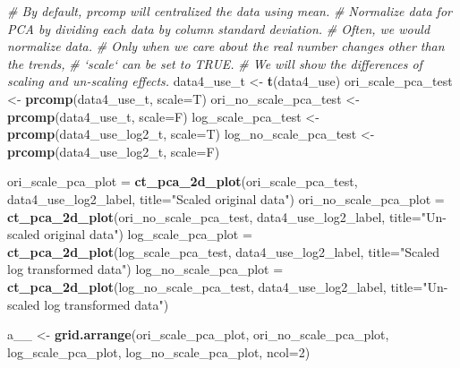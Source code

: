 \documentclass[]{article}
\newenvironment{Shaded}{\begin{snugshade}}{\end{snugshade}}
\newcommand{\KeywordTok}[1]{\textcolor[rgb]{0.13,0.29,0.53}{\textbf{{#1}}}}
\newcommand{\DataTypeTok}[1]{\textcolor[rgb]{0.13,0.29,0.53}{{#1}}}
\newcommand{\DecValTok}[1]{\textcolor[rgb]{0.00,0.00,0.81}{{#1}}}
\newcommand{\StringTok}[1]{\textcolor[rgb]{0.31,0.60,0.02}{{#1}}}
\newcommand{\CommentTok}[1]{\textcolor[rgb]{0.56,0.35,0.01}{\textit{{#1}}}}
\newcommand{\NormalTok}[1]{{#1}}
\numberwithin{figure}{section}
\numberwithin{table}{section}
\theoremstyle{definition}
\theoremstyle{definition}
\theoremstyle{definition}
\theoremstyle{remark}
\begin{document}
\begin{Shaded}
\begin{Highlighting}[]
\CommentTok{# By default, prcomp will centralized the data using mean.}
\CommentTok{# Normalize data for PCA by dividing each data by column standard deviation.}
\CommentTok{# Often, we would normalize data.}
\CommentTok{# Only when we care about the real number changes other than the trends,}
\CommentTok{# `scale` can be set to TRUE. }
\CommentTok{# We will show the differences of scaling and un-scaling effects.}
\NormalTok{data4_use_t <-}\StringTok{ }\KeywordTok{t}\NormalTok{(data4_use)}
\NormalTok{ori_scale_pca_test <-}\StringTok{ }\KeywordTok{prcomp}\NormalTok{(data4_use_t, }\DataTypeTok{scale=}\NormalTok{T)}
\NormalTok{ori_no_scale_pca_test <-}\StringTok{ }\KeywordTok{prcomp}\NormalTok{(data4_use_t, }\DataTypeTok{scale=}\NormalTok{F)}
\NormalTok{log_scale_pca_test <-}\StringTok{ }\KeywordTok{prcomp}\NormalTok{(data4_use_log2_t, }\DataTypeTok{scale=}\NormalTok{T)}
\NormalTok{log_no_scale_pca_test <-}\StringTok{ }\KeywordTok{prcomp}\NormalTok{(data4_use_log2_t, }\DataTypeTok{scale=}\NormalTok{F)}
\end{Highlighting}
\end{Shaded}

\begin{Shaded}
\begin{Highlighting}[]
\NormalTok{ori_scale_pca_plot =}\StringTok{ }\KeywordTok{ct_pca_2d_plot}\NormalTok{(ori_scale_pca_test, data4_use_log2_label, }
        \DataTypeTok{title=}\StringTok{"Scaled original data"}\NormalTok{)}
\NormalTok{ori_no_scale_pca_plot =}\StringTok{ }\KeywordTok{ct_pca_2d_plot}\NormalTok{(ori_no_scale_pca_test, data4_use_log2_label, }
        \DataTypeTok{title=}\StringTok{"Un-scaled original data"}\NormalTok{)}
\NormalTok{log_scale_pca_plot =}\StringTok{ }\KeywordTok{ct_pca_2d_plot}\NormalTok{(log_scale_pca_test, data4_use_log2_label, }
        \DataTypeTok{title=}\StringTok{"Scaled log transformed data"}\NormalTok{)}
\NormalTok{log_no_scale_pca_plot =}\StringTok{ }\KeywordTok{ct_pca_2d_plot}\NormalTok{(log_no_scale_pca_test, data4_use_log2_label, }
        \DataTypeTok{title=}\StringTok{"Un-scaled log transformed data"}\NormalTok{)}

\NormalTok{a__ <-}\StringTok{ }\KeywordTok{grid.arrange}\NormalTok{(ori_scale_pca_plot, ori_no_scale_pca_plot, log_scale_pca_plot, }
        \NormalTok{log_no_scale_pca_plot, }\DataTypeTok{ncol=}\DecValTok{2}\NormalTok{)}
\end{Highlighting}
\end{Shaded}
\end{document}
